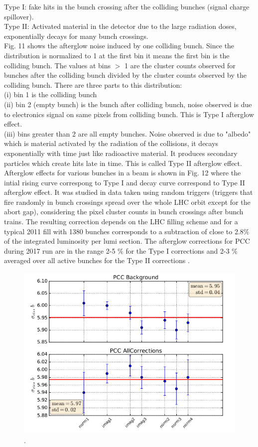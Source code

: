 Type I: fake hits in the bunch crossing after the colliding bunches (signal charge spillover).\\

Type II: Activated material in the detector due to the large radiation doses, exponentially decays for many bunch crossings.\\

Fig. 11 shows the afterglow noise induced by one colliding bunch. Since the distribution is normalized to 1 at the first bin it means the first bin is the colliding bunch. The values at bins $>$ 1 are the cluster counts observed for bunches after the colliding bunch divided by the cluster counts observed by the colliding bunch. There are three parts to this distribution: \\

(i) bin 1 is the colliding bunch \\

(ii) bin 2 (empty bunch) is the bunch after colliding bunch, noise observed is due to electronics signal on same pixels from colliding bunch. This is Type I afterglow effect. \\

(iii) bins greater than 2 are all empty bunches. Noise observed is due to "albedo" which is material activated by the radiation of the collisions, it decays exponentially with time just like radioactive material. It produces secondary particles which create hits late in time. This is called Type II afterglow effect. \\

 Afterglow effects for various bunches in a beam is shown in Fig. 12 where the intial rising curve correspong to Type I and decay curve correspond to Type II afterglow effect. It was studied in data taken using random triggers (triggers that fire randomly in bunch crossings spread over the whole LHC orbit except for the abort gap), considering the pixel cluster counts in bunch crossings after bunch trains. The resulting correction depends on the LHC filling scheme and for a typical 2011 fill with 1380 bunches corresponds to a subtraction of close to 2.8$\%$ of the integrated luminosity per lumi section. The afterglow corrections for PCC during 2017 run are in the range 2-5 $\%$ for the Type I corrections and 2-3 $\%$ averaged over all active bunches for the Type II corrections \cite{Sirunyan:2759951}.


\begin{figure}[H]
  \centering
  \includegraphics[width=0.5\columnwidth]{./PCC_background.png}
  \caption{ \onehalfspacing \cite{}.}
  \label{fig:CMS}
\end{figure}


